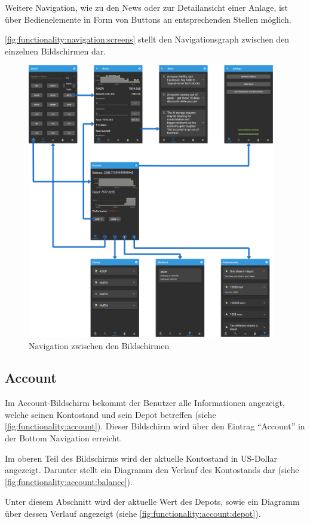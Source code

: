 \documentclass[a4paper]{article}
\begin{document}
Weitere Navigation, wie zu den News oder zur Detailansicht einer Anlage, ist über Bedienelemente in Form von Buttons an entsprechenden Stellen möglich.

\autoref{fig:functionality:navigation:screens} stellt den Navigationsgraph zwischen den einzelnen Bildschirmen dar.
\begin{figure}[H]
	\centering
	\includegraphics[height=12cm]{./images/navigation_screens/navigation_screens.png}
	\caption{Navigation zwischen den Bildschirmen}
	\label{fig:functionality:navigation:screens}
\end{figure}


\subsection{Account}
\label{subsec:functionality:account}
Im Account-Bildschirm bekommt der Benutzer alle Informationen angezeigt, welche seinen Kontostand und sein Depot betreffen (siehe \autoref{fig:functionality:account}). Dieser Bildschirm wird über den Eintrag "`Account"' in der Bottom Navigation erreicht.

Im oberen Teil des Bildschirms wird der aktuelle Kontostand in US-Dollar angezeigt. Darunter stellt ein Diagramm den Verlauf des Kontostands dar (siehe \autoref{fig:functionality:account:balance}).

Unter diesem Abschnitt wird der aktuelle Wert des Depots, sowie ein Diagramm über dessen Verlauf angezeigt (siehe \autoref{fig:functionality:account:depot}).
\end{document}
